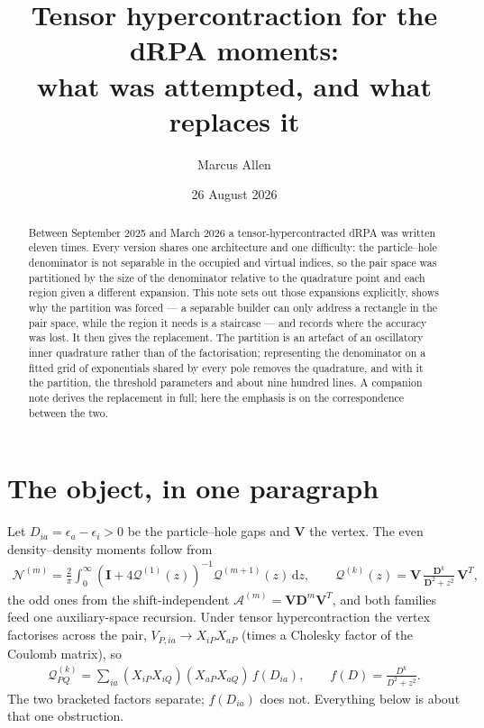 \documentclass[11pt]{article}
\title{\vspace{-1.5cm}Tensor hypercontraction for the dRPA moments:\\
what was attempted, and what replaces it}
\author{Marcus Allen}
\date{26 August 2026}
\newcommand{\mat}[1]{{\mathbf{#1}}}
\newcommand{\parth}[1]{\left(#1\right)}
\newcommand{\Dcal}{\mathcal{A}}
\newcommand{\Qcal}{\mathcal{Q}}
\newcommand{\Ncal}{\mathcal{N}}
\begin{document}
\maketitle
\vspace{-1.0cm}

\begin{abstract}
\noindent
Between September 2025 and March 2026 a tensor-hypercontracted dRPA was written eleven
times. Every version shares one architecture and one difficulty: the particle--hole
denominator is not separable in the occupied and virtual indices, so the pair space was
partitioned by the size of the denominator relative to the quadrature point and each region
given a different expansion. This note sets out those expansions explicitly, shows why the
partition was forced --- a separable builder can only address a rectangle in the pair space,
while the region it needs is a staircase --- and records where the accuracy was lost. It
then gives the replacement. The partition is an artefact of an oscillatory inner quadrature
rather than of the factorisation; representing the denominator on a fitted grid of
exponentials shared by every pole removes the quadrature, and with it the partition, the
threshold parameters and about nine hundred lines. A companion note derives the replacement
in full; here the emphasis is on the correspondence between the two.
\end{abstract}

\section{The object, in one paragraph}

Let $D_{ia} = \epsilon_a - \epsilon_i > 0$ be the particle--hole gaps and $\mat{V}$ the
vertex. The even density--density moments follow from
\begin{align}
    \Ncal^{(m)}
    = \frac{2}{\pi} \int_0^\infty
      \parth{\mat{I} + 4\Qcal^{(1)}(z)}^{-1} \Qcal^{(m+1)}(z) \,\mathrm{d}z ,
    \qquad
    \Qcal^{(k)}(z) = \mat{V}\, \frac{\mat{D}^{k}}{\mat{D}^2 + z^2}\, \mat{V}^T ,
    \label{eq:compact}
\end{align}
the odd ones from the shift-independent $\Dcal^{(m)} = \mat{V}\mat{D}^m\mat{V}^T$, and both
families feed one auxiliary-space recursion. Under tensor hypercontraction the vertex
factorises across the pair, $V_{P,ia} \to X_{iP} X_{aP}$ (times a Cholesky factor of the
Coulomb matrix), so
\begin{align}
    \Qcal^{(k)}_{PQ} = \sum_{ia} \parth{X_{iP} X_{iQ}} \parth{X_{aP} X_{aQ}}\, f(D_{ia}) ,
    \qquad f(D) = \frac{D^k}{D^2+z^2} .
    \label{eq:contract}
\end{align}
The two bracketed factors separate; $f(D_{ia})$ does not. Everything below is about that
one obstruction.
\end{document}
